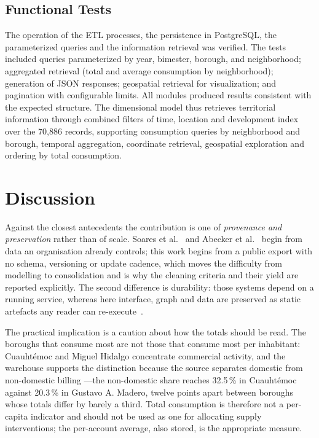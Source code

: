 \documentclass[runningheads]{llncs}
\newif\ifmarcarcambios
\newcommand{\icokg}[1]{\ifmarcarcambios\textcolor{nuevo}{#1}\else#1\fi}
\newenvironment{icokgblock}{\ifmarcarcambios\color{nuevo}\fi}{}
\renewcommand{\_}{\origunderscore\allowbreak}
\begin{document}
\subsection{Functional Tests}

\icokg{The operation of the ETL processes, the persistence in PostgreSQL, the parameterized queries and the information retrieval was verified.} The tests included queries parameterized by year, bimester, borough, and neighborhood; aggregated retrieval (total and average consumption by neighborhood); generation of JSON responses; geospatial retrieval for visualization; and pagination with configurable limits. All modules produced results consistent with the expected structure. The dimensional model thus retrieves territorial information through combined filters of time, location and development index over the 70,886 records, supporting consumption queries by neighborhood and borough, temporal aggregation, coordinate retrieval, geospatial exploration and ordering by total consumption.

\begin{icokgblock}
\section{Discussion}
\label{sec:disc}

Against the closest antecedents the contribution is one of \emph{provenance and
preservation} rather than of scale. Soares et al.~\cite{soares2019} and Abecker
et al.~\cite{abecker2014} begin from data an organisation already controls; this
work begins from a public export with no schema, versioning or update cadence,
which moves the difficulty from modelling to consolidation and is why the
cleaning criteria and their yield are reported explicitly. The second difference
is durability: those systems depend on a running service, whereas here interface,
graph and data are preserved as static artefacts any reader can
re-execute~\cite{sandve2013,hill2023}.

The practical implication is a caution about how the totals should be read. The
boroughs that consume most are not those that consume most per inhabitant:
Cuauht\'emoc and Miguel Hidalgo concentrate commercial activity, and the
warehouse supports the distinction because the source separates domestic from
non-domestic billing ---the non-domestic share reaches 32.5\,\% in Cuauht\'emoc
against 20.3\,\% in Gustavo A. Madero, twelve points apart between boroughs whose
totals differ by barely a third. Total consumption is therefore not a per-capita
indicator and should not be used as one for allocating supply interventions; the
per-account average, also stored, is the appropriate measure.
\end{icokgblock}
\end{document}
